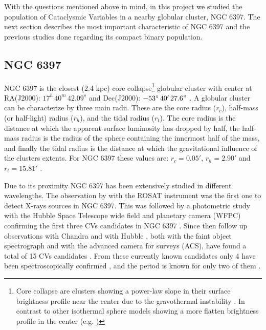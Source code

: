 With the questions mentioned above in mind, in this project we studied the population of Cataclysmic Variables in a nearby globular cluster, NGC 6397. The next section describes the most important characteristic of NGC 6397 and the previous studies done regarding its compact binary population. 



\subsection{NGC 6397}
NGC 6397 is the closest (2.4 kpc) core collapse\footnote{Core collapse are clusters showing a power-law slope in their surface brightness profile near the center due to the gravothermal instability \citep{antonov_solution_1962,lynden-bell_gravo-thermal_1968,lynden-bell_consequences_1980}. In contrast to other isothermal sphere models showing a more flatten brightness profile in the center (e.g. \cite{king_structure_1966})} globular cluster \citep{harris_catalog_1996,mclaughlin_resolved_2005} with center at RA(J2000): $17^h \, 40^m \, 42.09^s$  and Dec(J2000): $-53^\circ \, 40'\, 27.6"$ \citep{harris_catalog_1996}. A globular cluster can be characterize by three main radii. These are the core radius ($r_c$), half-mass (or half-light) radius ($r_h$), and the tidal radius ($r_t$). The core radius is the distance at which the apparent surface luminosity has dropped by half, the half-mass radius is the radius of the sphere containing the innermost half of the mass, and finally the tidal radius is the distance at which the gravitational influence of the clusters extents. For NGC 6397 these values are: $r_c=0.05'$, $r_h=2.90'$ and $r_t = 15.81'$ \citep{harris_catalog_1996}. 

Due to its proximity NGC 6397 has been extensively studied in different  wavelengths. The observation by \cite{cool_discovery_1993} with the ROSAT instrument was the first one to detect X-rays sources in NGC 6397. This was followed by a photometric study with the Hubble Space Telescope wide field and planetary camera (WFPC) confirming the first three CVs candidates in NGC 6397 \citep{cool_discovery_1995}. Since then follow up observations with Chandra \citep{grindlay_chandra_2001,bogdanov_chandra_2010} and with Hubble \citep{taylor_helium_2001,grindlay_compact_2006}, both with the faint object spectrograph and with the advanced camera for surveys (ACS), have found a total of 15 CVs candidates \citep{cohn_identification_2010}. From these currently known candidates only 4 have been spectroscopically confirmed \citep{grindlay_spectroscopic_1995,edmonds_cataclysmic_1999}, and the period is known for only two of them \citep{kaluzny_time_2003,kaluzny_photometric_2006}. 

